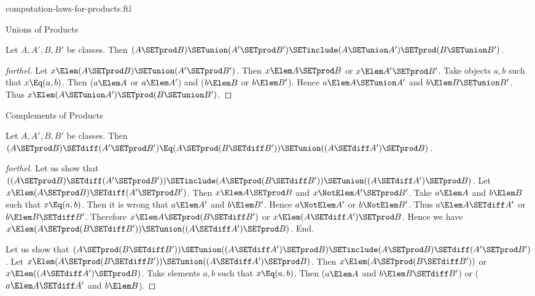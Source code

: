 \documentclass{stex}
\begin{document}
\begin{smodule}{computation-laws-for-products.ftl}
\begin{sfragment}{Unions of Products}
  \begin{proposition}[forthel]
    Let $A, A', B, B'$ be classes.
    Then $(A \SETprod B) \SETunion (A' \SETprod B') \SETinclude (A \SETunion A') \SETprod (B \SETunion B')$.
  \end{proposition}
  \begin{proof}[forthel]
    Let $x \Elem (A \SETprod B) \SETunion (A' \SETprod B')$.
    Then $x \Elem A \SETprod B$ or $x \Elem A' \SETprod B'$.
    Take objects $a, b$ such that $x \Eq (a, b)$.
    Then ($a \Elem A$ or $a \Elem A'$) and ($b \Elem B$ or $b \Elem B'$).
    Hence $a \Elem A \SETunion A'$ and $b \Elem B \SETunion B'$.
    Thus $x \Elem (A \SETunion A') \SETprod (B \SETunion B')$.
  \end{proof}
\end{sfragment}

\begin{sfragment}{Complements of Products}
  \begin{proposition}[forthel]
    Let $A, A', B, B'$ be classes.
    Then $(A \SETprod B) \SETdiff (A' \SETprod B') \Eq (A \SETprod (B \SETdiff B')) \SETunion ((A \SETdiff A') \SETprod B)$.
  \end{proposition}
  \begin{proof}[forthel]
    Let us show that $((A \SETprod B) \SETdiff (A' \SETprod B')) \SETinclude (A \SETprod (B \SETdiff B')) \SETunion ((A \SETdiff A') \SETprod B)$.
      Let $x \Elem (A \SETprod B) \SETdiff (A' \SETprod B')$.
      Then $x \Elem A \SETprod B$ and $x \NotElem A' \SETprod B'$.
      Take $a \Elem A$ and $b \Elem B$ such that $x \Eq (a, b)$.
      Then it is wrong that $a \Elem A'$ and $b \Elem B'$.
      Hence $a \NotElem A'$ or $b \NotElem B'$.
      Thus $a \Elem A \SETdiff A'$ or $b \Elem B \SETdiff B'$.
      Therefore $x \Elem A \SETprod (B \SETdiff B')$ or $x \Elem (A \SETdiff A') \SETprod B$.
      Hence we have $x \Elem (A \SETprod (B \SETdiff B')) \SETunion ((A \SETdiff A') \SETprod B)$.
    End.

    Let us show that $(A \SETprod (B \SETdiff B')) \SETunion ((A \SETdiff A') \SETprod B) \SETinclude (A \SETprod B) \SETdiff (A' \SETprod B')$.
      Let $x \Elem (A \SETprod (B \SETdiff B')) \SETunion ((A \SETdiff A') \SETprod B)$.
      Then $x \Elem (A \SETprod (B \SETdiff B'))$ or $x \Elem ((A \SETdiff A') \SETprod B)$.
      Take elements $a,b$ such that $x \Eq (a, b)$.
      Then ($a \Elem A$ and $b \Elem B \SETdiff B'$) or ($a \Elem A \SETdiff A'$ and $b \Elem B$).


\end{proof}
\end{sfragment}
\end{smodule}
\end{document}
